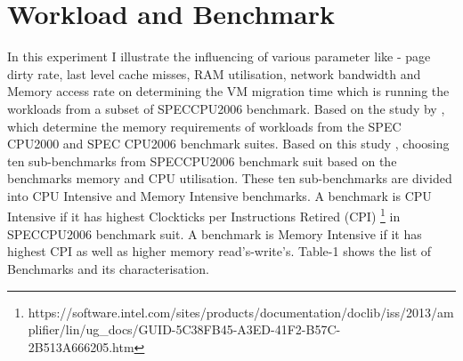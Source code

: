 \documentclass[a4paper,10pt,twoside]{article}
\begin{document}
\section{Workload and Benchmark}
In this experiment I illustrate the influencing of various parameter like - page dirty rate, last level cache misses, RAM utilisation, network bandwidth and Memory access rate on determining the VM migration time which is running the workloads from a subset of SPECCPU2006 benchmark.  Based on the study by \cite{jaleel2010memory}, which determine the memory requirements of workloads from the SPEC CPU2000 and SPEC CPU2006 benchmark suites. Based on this study \cite{jaleel2010memory}, choosing ten sub-benchmarks from SPECCPU2006 benchmark suit based on the benchmarks memory and CPU utilisation. These ten sub-benchmarks are divided into CPU Intensive and Memory Intensive benchmarks. A benchmark is CPU Intensive if it has highest Clockticks per Instructions Retired (CPI) \footnote{https://software.intel.com/sites/products/documentation/doclib/iss/2013/amplifier/lin/ug\_docs/GUID-5C38FB45-A3ED-41F2-B57C-2B513A666205.htm} in SPECCPU2006 benchmark suit. A benchmark is Memory Intensive if it has highest CPI as well as higher memory read's-write's. 
Table-1 shows the list of Benchmarks and its characterisation. 
\end{document}
